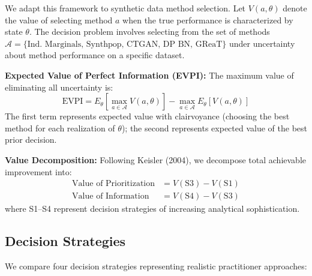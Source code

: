 \documentclass[12pt,a4paper]{article}
\begin{document}
We adapt this framework to synthetic data method selection. Let $V(a, \theta)$ denote the value of selecting method $a$ when the true performance is characterized by state $\theta$. The decision problem involves selecting from the set of methods $\mathcal{A} = \{\text{Ind.\ Marginals, Synthpop, CTGAN, DP BN, GReaT}\}$ under uncertainty about method performance on a specific dataset.

\textbf{Expected Value of Perfect Information (EVPI):} The maximum value of eliminating all uncertainty is:
\begin{equation}
\text{EVPI} = E_\theta\left[\max_{a \in \mathcal{A}} V(a, \theta)\right] - \max_{a \in \mathcal{A}} E_\theta[V(a, \theta)]
\end{equation}
The first term represents expected value with clairvoyance (choosing the best method for each realization of $\theta$); the second represents expected value of the best prior decision.

\textbf{Value Decomposition:} Following Keisler (2004), we decompose total achievable improvement into:
\begin{align}
\text{Value of Prioritization} &= V(\text{S3}) - V(\text{S1}) \\
\text{Value of Information} &= V(\text{S4}) - V(\text{S3})
\end{align}
where S1--S4 represent decision strategies of increasing analytical sophistication.

\subsection{Decision Strategies}

We compare four decision strategies representing realistic practitioner approaches:
\end{document}
